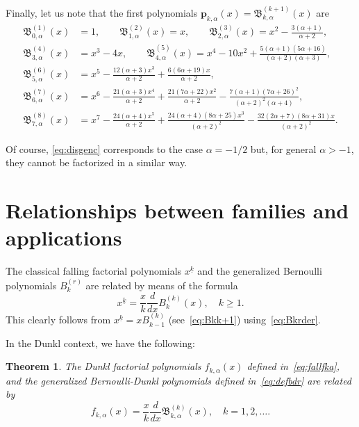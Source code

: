 \documentclass[11pt]{article}
\theoremstyle{plain}
\newtheorem{theorem}{Theorem}[section]
\theoremstyle{remark}
\numberwithin{equation}{section} %
\newcommand{\B}{\mathfrak{B}}
\begin{document}
Finally, let us note that the first polynomials $\mathbf{p}_{k,\alpha}(x) = \B_{k,\alpha}^{(k+1)}(x)$ are
\begin{align*}
\B_{0,\alpha}^{(1)}(x) &= 1, \qquad
\B_{1,\alpha}^{(2)}(x) = x, \qquad
\B_{2,\alpha}^{(3)}(x) = x^2 - \frac{3 (\alpha +1)}{\alpha +2}, \\
\B_{3,\alpha}^{(4)}(x) &= x^3 - 4 x, \qquad
\B_{4,\alpha}^{(5)}(x) = x^4 - 10 x^2 
  + \frac{5 (\alpha +1) (5 \alpha +16)}{(\alpha +2) (\alpha +3)}, \\
\B_{5,\alpha}^{(6)}(x) &= x^5 - \frac{12 (\alpha +3) x^3}{\alpha +2}
  + \frac{6 (6\alpha +19) x}{\alpha +2}, \\
\B_{6,\alpha}^{(7)}(x) &= x^6 - \frac{21 (\alpha +3) x^4}{\alpha +2}
  + \frac{21 (7 \alpha +22) x^2}{\alpha +2}
  - \frac{7 (\alpha +1) (7 \alpha +26)^2}{(\alpha +2)^2 (\alpha +4)}, \\
\B_{7,\alpha}^{(8)}(x) &= x^7 -\frac{24 (\alpha +4) x^5}{\alpha +2}
  + \frac{24 (\alpha +4) (8\alpha +25) x^3}{(\alpha +2)^2} 
  - \frac{32 (2\alpha+7)(8\alpha+31) x}{(\alpha +2)^2}.
\end{align*}

Of course, \eqref{eq:disgenc} corresponds to the case $\alpha=-1/2$  but, for general $\alpha>-1$, they cannot be factorized in a similar way.


\section{Relationships between families and applications}
\label{sec:connection}


The classical falling factorial polynomials $x^{\underline{k}}$ and the generalized Bernoulli polynomials $B_k^{(r)}$ are related by means of the formula
\[
    x^{\underline{k}} = \frac{x}{k} \frac{d}{dx} B_{k}^{(k)}(x),
    \quad k \ge 1.
\]
This clearly follows from $x^{\underline{k}} = xB_{k-1}^{(k)}$ (see~\eqref{eq:Bkk+1}) using~\eqref{eq:Bkrder}.

In the Dunkl context, we have the following:

\begin{theorem}
\label{teo:relation}
The Dunkl factorial polynomials $f_{k,\alpha}(x)$ defined in~\eqref{eq:fallfka}, and the generalized Bernoulli-Dunkl polynomials defined in~\eqref{eq:defbdr} are related by
\begin{equation}
\label{eq:relation}
    f_{k,\alpha}(x) = \frac{x}{k} \frac{d}{dx}\B_{k,\alpha}^{(k)}(x),
    \quad k = 1,2,\ldots.
\end{equation}
\end{theorem}
\end{document}
